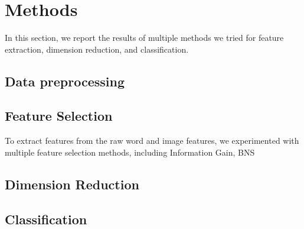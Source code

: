 \section{Methods}
In this section, we report the results of multiple methods we tried for feature extraction, dimension reduction, and classification. 

\subsection{Data preprocessing}

\subsection{Feature Selection}
To extract features from the raw word and image features, we experimented with multiple feature selection methods, including Information Gain, BNS
\subsection{Dimension Reduction}
\subsection{Classification}



